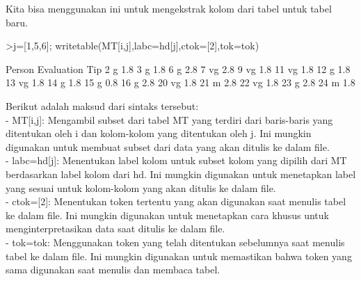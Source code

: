 \documentclass[a4paper,10pt]{article}
\begin{document}
\begin{eulernotebook}
\begin{eulercomment}
\begin{eulercomment}
\begin{eulercomment}
\begin{eulercomment}
\begin{eulercomment}
\begin{eulercomment}
\begin{eulercomment}
\begin{eulercomment}
\begin{eulercomment}
\begin{eulercomment}
\begin{eulercomment}
\begin{eulercomment}
\begin{eulercomment}
\begin{eulercomment}
\begin{eulercomment}
\begin{eulercomment}
\begin{eulercomment}
Kita bisa menggunakan ini untuk mengekstrak kolom dari tabel untuk
tabel baru.
\end{eulercomment}
\begin{eulerprompt}
>j=[1,5,6]; writetable(MT[i,j],labc=hd[j],ctok=[2],tok=tok)
\end{eulerprompt}
\begin{euleroutput}
      Person Evaluation       Tip
           2          g       1.8
           3          g       1.8
           6          g       2.8
           7         vg       2.8
           9         vg       1.8
          11         vg       1.8
          12          g       1.8
          13         vg       1.8
          14          g       1.8
          15          g       0.8
          16          g       2.8
          20         vg       1.8
          21          m       2.8
          22         vg       1.8
          23          g       2.8
          24          m       1.8
\end{euleroutput}
\begin{eulercomment}
Berikut adalah maksud dari sintaks tersebut:\\
- MT[i,j]: Mengambil subset dari tabel MT yang terdiri dari
baris-baris yang ditentukan oleh i dan kolom-kolom yang ditentukan
oleh j. Ini mungkin digunakan untuk membuat subset dari data yang akan
ditulis ke dalam file.\\
- labc=hd[j]: Menentukan label kolom untuk subset kolom yang dipilih
dari MT berdasarkan label kolom dari hd. Ini mungkin digunakan untuk
menetapkan label yang sesuai untuk kolom-kolom yang akan ditulis ke
dalam file.\\
- ctok=[2]: Menentukan token tertentu yang akan digunakan saat menulis
tabel ke dalam file. Ini mungkin digunakan untuk menetapkan cara
khusus untuk menginterpretasikan data saat ditulis ke dalam file.\\
- tok=tok: Menggunakan token yang telah ditentukan sebelumnya saat
menulis tabel ke dalam file. Ini mungkin digunakan untuk memastikan
bahwa token yang sama digunakan saat menulis dan membaca tabel.


\end{eulercomment}
\end{eulercomment}
\end{eulercomment}
\end{eulercomment}
\end{eulercomment}
\end{eulercomment}
\end{eulercomment}
\end{eulercomment}
\end{eulercomment}
\end{eulercomment}
\end{eulercomment}
\end{eulercomment}
\end{eulercomment}
\end{eulercomment}
\end{eulercomment}
\end{eulercomment}
\end{eulercomment}
\end{eulernotebook}
\end{document}

